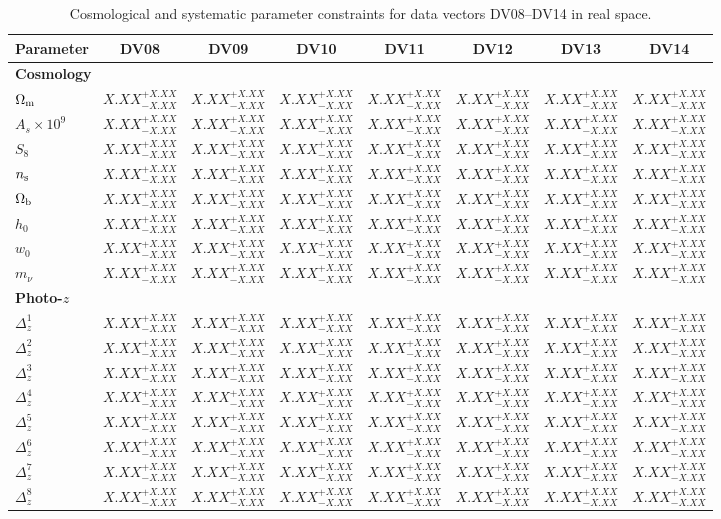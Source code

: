 \documentclass[%
reprint,
superscriptaddress,
 amsmath,amssymb,
 aps,
]{revtex4-2}
\newcommand{\dvres}{$X.XX^{+X.XX}_{-X.XX}$}
\begin{document}
\begin{table}[htbp]
\centering
\caption{Cosmological and systematic parameter constraints
for data vectors DV08--DV14 in real space.}
\label{tab:results_b}
\footnotesize
\setlength{\tabcolsep}{8pt}
\renewcommand{\arraystretch}{1.15}

\begin{tabular}{l*{7}{c}}
\hline\hline
Parameter & DV08 & DV09 & DV10 & DV11 & DV12 & DV13 & DV14 \\
\hline

\multicolumn{8}{l}{\textbf{Cosmology}} \\
\hline
$\Omega_{\rm m}$ & \dvres & \dvres & \dvres & \dvres & \dvres & \dvres & \dvres \\
$A_s\times 10^9$ & \dvres & \dvres & \dvres & \dvres & \dvres & \dvres & \dvres \\
$S_8$ & \dvres & \dvres & \dvres & \dvres & \dvres & \dvres & \dvres \\
$n_{\rm s}$ & \dvres & \dvres & \dvres & \dvres & \dvres & \dvres & \dvres \\
$\Omega_{\rm b}$ & \dvres & \dvres & \dvres & \dvres & \dvres & \dvres & \dvres \\
$h_0$ & \dvres & \dvres & \dvres & \dvres & \dvres & \dvres & \dvres \\
$w_0$ & \dvres & \dvres & \dvres & \dvres & \dvres & \dvres & \dvres \\
$m_\nu$ & \dvres & \dvres & \dvres & \dvres & \dvres & \dvres & \dvres \\

\hline
\multicolumn{8}{l}{\textbf{Photo-$z$}} \\
\hline
$\Delta_z^1$ & \dvres & \dvres & \dvres & \dvres & \dvres & \dvres & \dvres \\
$\Delta_z^2$ & \dvres & \dvres & \dvres & \dvres & \dvres & \dvres & \dvres \\
$\Delta_z^3$ & \dvres & \dvres & \dvres & \dvres & \dvres & \dvres & \dvres \\
$\Delta_z^4$ & \dvres & \dvres & \dvres & \dvres & \dvres & \dvres & \dvres \\
$\Delta_z^5$ & \dvres & \dvres & \dvres & \dvres & \dvres & \dvres & \dvres \\
$\Delta_z^6$ & \dvres & \dvres & \dvres & \dvres & \dvres & \dvres & \dvres \\
$\Delta_z^7$ & \dvres & \dvres & \dvres & \dvres & \dvres & \dvres & \dvres \\
$\Delta_z^8$ & \dvres & \dvres & \dvres & \dvres & \dvres & \dvres & \dvres \\


\end{tabular}
\end{table}
\end{document}
